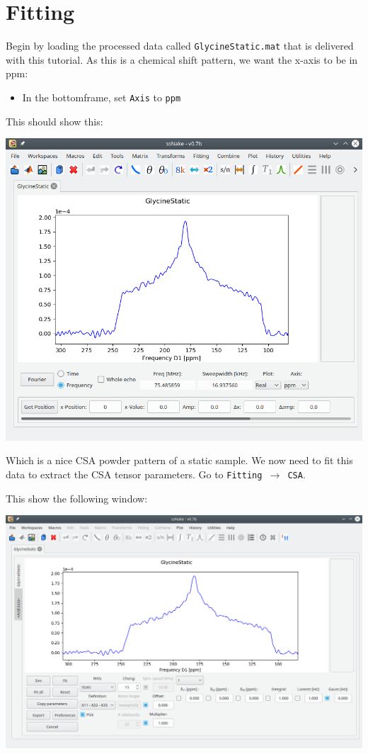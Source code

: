 \documentclass[11pt,a4paper]{article}
\begin{document}
\section{Fitting}
Begin by loading the processed data called \texttt{GlycineStatic.mat} that is delivered with this
tutorial. As this is a chemical shift pattern, we want the x-axis to be in ppm:
\begin{itemize}
  \item In the bottomframe, set \texttt{Axis} to \texttt{ppm}
\end{itemize}
This should show this:
\begin{center}
\includegraphics[width=0.8\linewidth]{Figs/Fig1.png}
\end{center}
Which is a nice CSA powder pattern of a static sample. We now need to fit this data to extract the
CSA tensor parameters. Go to \texttt{Fitting $\longrightarrow$ CSA}.

This show the following window:
\begin{center}
\includegraphics[width=0.8\linewidth]{Figs/Fig2.png}
\end{center}
\end{document}
